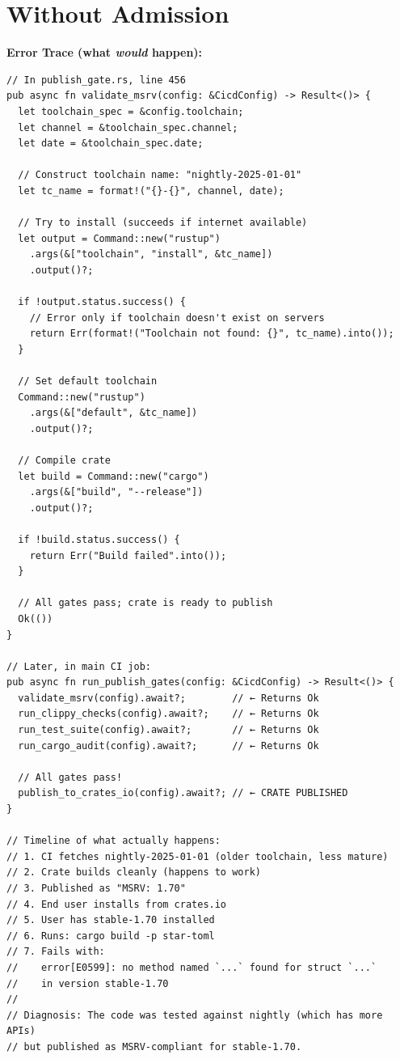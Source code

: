 \documentclass[11pt,a4paper]{article}
\begin{document}
\section*{Without Admission}

\textbf{Error Trace (what \emph{would} happen):}

\begin{lstlisting}
// In publish_gate.rs, line 456
pub async fn validate_msrv(config: &CicdConfig) -> Result<()> {
  let toolchain_spec = &config.toolchain;
  let channel = &toolchain_spec.channel;
  let date = &toolchain_spec.date;

  // Construct toolchain name: "nightly-2025-01-01"
  let tc_name = format!("{}-{}", channel, date);

  // Try to install (succeeds if internet available)
  let output = Command::new("rustup")
    .args(&["toolchain", "install", &tc_name])
    .output()?;

  if !output.status.success() {
    // Error only if toolchain doesn't exist on servers
    return Err(format!("Toolchain not found: {}", tc_name).into());
  }

  // Set default toolchain
  Command::new("rustup")
    .args(&["default", &tc_name])
    .output()?;

  // Compile crate
  let build = Command::new("cargo")
    .args(&["build", "--release"])
    .output()?;

  if !build.status.success() {
    return Err("Build failed".into());
  }

  // All gates pass; crate is ready to publish
  Ok(())
}

// Later, in main CI job:
pub async fn run_publish_gates(config: &CicdConfig) -> Result<()> {
  validate_msrv(config).await?;        // ← Returns Ok
  run_clippy_checks(config).await?;    // ← Returns Ok
  run_test_suite(config).await?;       // ← Returns Ok
  run_cargo_audit(config).await?;      // ← Returns Ok

  // All gates pass!
  publish_to_crates_io(config).await?; // ← CRATE PUBLISHED
}

// Timeline of what actually happens:
// 1. CI fetches nightly-2025-01-01 (older toolchain, less mature)
// 2. Crate builds cleanly (happens to work)
// 3. Published as "MSRV: 1.70"
// 4. End user installs from crates.io
// 5. User has stable-1.70 installed
// 6. Runs: cargo build -p star-toml
// 7. Fails with:
//    error[E0599]: no method named `...` found for struct `...`
//    in version stable-1.70
//
// Diagnosis: The code was tested against nightly (which has more APIs)
// but published as MSRV-compliant for stable-1.70.
\end{lstlisting}
\end{document}

